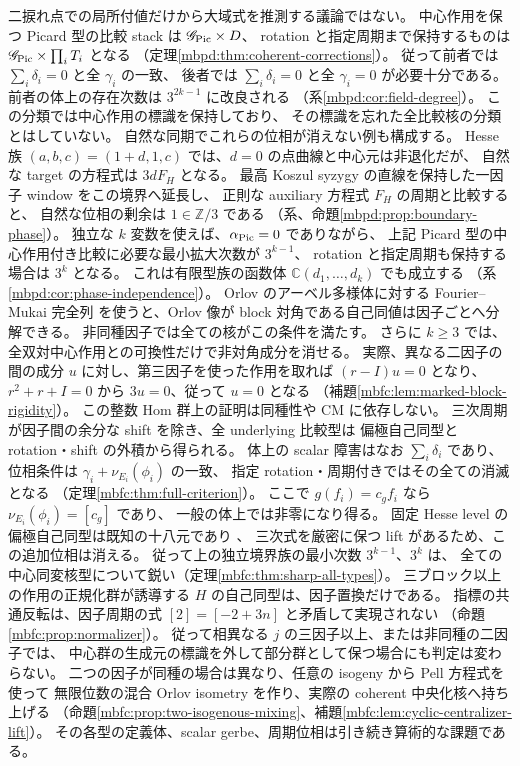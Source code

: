 二捩れ点での局所付値だけから大域式を推測する議論ではない。
中心作用を保つ Picard 型の比較 stack は
$\mathscr G_{\rm Pic}\times D$、
rotation と指定周期まで保持するものは
$\mathscr G_{\rm Pic}\times\prod_iT_i$ となる
（定理\ref{mbpd:thm:coherent-corrections}）。
従って前者では $\sum_i\delta_i=0$ と全 $\gamma_i$ の一致、
後者では $\sum_i\delta_i=0$ と全 $\gamma_i=0$ が必要十分である。
前者の体上の存在次数は $3^{2k-1}$ に改良される
（系\ref{mbpd:cor:field-degree}）。
この分類では中心作用の標識を保持しており、
その標識を忘れた全比較核の分類とはしていない。
自然な同期でこれらの位相が消えない例も構成する。
Hesse 族 $(a,b,c)=(1+d,1,c)$ では、$d=0$ の点曲線と中心元は非退化だが、
自然な target の方程式は $3dF_H$ となる。
最高 Koszul syzygy の直線を保持した一因子 window をこの境界へ延長し、
正則な auxiliary 方程式 $F_H$ の周期と比較すると、
自然な位相の剰余は $1\in\mathbb Z/3$ である
（系、命題\ref{mbpd:prop:boundary-phase}）。
独立な $k$ 変数を使えば、$\alpha_{\rm Pic}=0$ でありながら、
上記 Picard 型の中心作用付き比較に必要な最小拡大次数が $3^{k-1}$、
rotation と指定周期も保持する場合は $3^k$ となる。
これは有限型族の函数体 $\mathbb C(d_1,\ldots,d_k)$ でも成立する
（系\ref{mbpd:cor:phase-independence}）。
Orlov のアーベル多様体に対する
Fourier--Mukai 完全列\cite[Propositions~2.15, 3.3, Theorem~4.14]{MBFCOrlovAbelian}
を使うと、Orlov 像が block 対角である自己同値は因子ごとへ分解できる。
非同種因子では全ての核がこの条件を満たす。
さらに $k\ge3$ では、全双対中心作用との可換性だけで非対角成分を消せる。
実際、異なる二因子の間の成分 $u$ に対し、第三因子を使った作用を取れば
$(r-I)u=0$ となり、$r^2+r+I=0$ から $3u=0$、従って $u=0$ となる
（補題\ref{mbfc:lem:marked-block-rigidity}）。
この整数 Hom 群上の証明は同種性や CM に依存しない。
三次周期が因子間の余分な shift を除き、全 underlying 比較型は
偏極自己同型と rotation・shift の外積から得られる。
体上の scalar 障害はなお $\sum_i\delta_i$ であり、
位相条件は $\gamma_i+\nu_{E_i}(\phi_i)$ の一致、
指定 rotation・周期付きではその全ての消滅となる
（定理\ref{mbfc:thm:full-criterion}）。
ここで $g(f_i)=c_gf_i$ なら $\nu_{E_i}(\phi_i)=[c_g]$ であり、
一般の体上では非零になり得る。
固定 Hesse level の偏極自己同型は既知の十八元であり
\cite[Section~4, pp.~246--247]{NFMArtebaniDolgachev}、
三次式を厳密に保つ lift があるため、この追加位相は消える。
従って上の独立境界族の最小次数 $3^{k-1}$、$3^k$ は、
全ての中心同変核型について鋭い（定理\ref{mbfc:thm:sharp-all-types}）。
三ブロック以上の作用の正規化群が誘導する $H$ の自己同型は、因子置換だけである。
指標の共通反転は、因子周期の式 $[2]=[-2+3n]$ と矛盾して実現されない
（命題\ref{mbfc:prop:normalizer}）。
従って相異なる $j$ の三因子以上、または非同種の二因子では、
中心群の生成元の標識を外して部分群として保つ場合にも判定は変わらない。
二つの因子が同種の場合は異なり、任意の isogeny から Pell 方程式を使って
無限位数の混合 Orlov isometry を作り、実際の coherent 中央化核へ持ち上げる
（命題\ref{mbfc:prop:two-isogenous-mixing}、補題\ref{mbfc:lem:cyclic-centralizer-lift}）。
その各型の定義体、scalar gerbe、周期位相は引き続き算術的な課題である。

